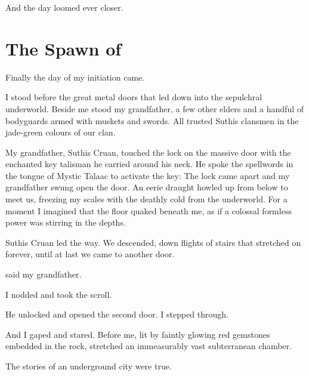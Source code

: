 \documentclass
  [a4paper,
   12pt,
   oneside
  ]%
  {article}
\begin{document}
And the day loomed ever closer. 















\section{The Spawn of \Dragons}
Finally the day of my initiation came. 

I stood before the great metal doors that led down into the sepulchral underworld.
Beside me stood my grandfather, a few other elders and a handful of bodyguards armed with muskets and swords.
All trusted Suthis clansmen in the jade-green colours of our clan. 



My grandfather, Suthis Cruan, touched the lock on the massive door with the enchanted key talisman he carried around his neck.
He spoke the spellwords in the \draconian tongue of Mystic Talaac to activate the key:%
The lock came apart and my grandfather swung open the door. 
An eerie draught howled up from below to meet us, freezing my scales with the deathly cold from the underworld. 
For a moment I imagined that the floor quaked beneath me, as if a colossal formless power was stirring in the depths. 

Suthis Cruan led the way.
We descended, down flights of stairs that stretched on forever, until at last we came to another door. 

 said my grandfather.

I nodded and took the scroll. 

He unlocked and opened the second door.
I stepped through.

And I gaped and stared. 
Before me, lit by faintly glowing red gemstones embedded in the rock, stretched an immeasurably vast subterranean chamber. 
 
The stories of an underground city were true. 
\end{document}
